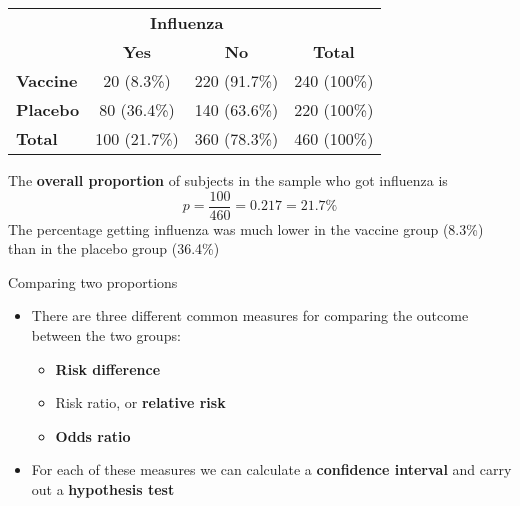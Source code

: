 \documentclass[compress, notes=hide]{beamer}
\newcommand{\hl}[1]{\textbf{#1}}
\begin{document}
\begin{frame}
\begin{block}{} 
\begin{table}
\begin{small}
\begin{tabular}{lccc}
\hline
& \multicolumn{2}{c}{\textbf{Influenza}} &
\\
\cline{2-3}
& \textbf{Yes} & \textbf{No} & \textbf{Total}
\\
\hline
\textbf{Vaccine} & 20 (8.3\%) & 220 (91.7\%) & 240 (100\%)
\\
\textbf{Placebo} & 80 (36.4\%) & 140 (63.6\%) & 220 (100\%)
\\
\hline
\textbf{Total} & 100 (21.7\%) & 360 (78.3\%) & 460 (100\%)
\\
\hline
\end{tabular}
\end{small}
\end{table}
The \hl{overall proportion} of subjects in the sample who
got influenza is
\begin{equation*}
p = \frac{100}{460} = 0.217 = 21.7\%
\end{equation*}
The percentage getting influenza was much lower in the
vaccine group (8.3\%) than in the placebo group (36.4\%)
\end{block}
\end{frame}




\begin{frame}
	\begin{block}{Comparing two proportions}
		\begin{itemize}
			\item There are three different common measures for comparing the
			outcome between the two groups:
			\begin{itemize}
				\item{\hl{Risk difference}}
				\item{Risk ratio, or \hl{relative risk}}
				\item{\hl{Odds ratio}}
			\end{itemize}
			\item For each of these measures we  can calculate a \hl{confidence
				interval} and carry out a \hl{hypothesis test}
		\end{itemize}
	\end{block}
\end{frame}
\end{document}

